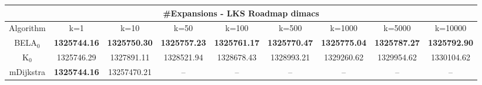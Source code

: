 \begin{tabular}{c|cccccccc}\toprule
\multicolumn{9}{c}{#Expansions - LKS Roadmap dimacs}\\ \midrule
Algorithm & k=1 & k=10 & k=50 & k=100 & k=500 & k=1000 & k=5000 & k=10000 \\ \midrule
BELA$_0$ & \textbf{1325744.16} & \textbf{1325750.30} & \textbf{1325757.23} & \textbf{1325761.17} & \textbf{1325770.47} & \textbf{1325775.04} & \textbf{1325787.27} & \textbf{1325792.90} \\
K$_0$ & 1325746.29 & 1327891.11 & 1328521.94 & 1328678.43 & 1328993.21 & 1329260.62 & 1329954.62 & 1330104.62 \\
mDijkstra & \textbf{1325744.16} & 13257470.21 & -- & -- & -- & -- & -- & -- \\ \bottomrule 
\end{tabular}
